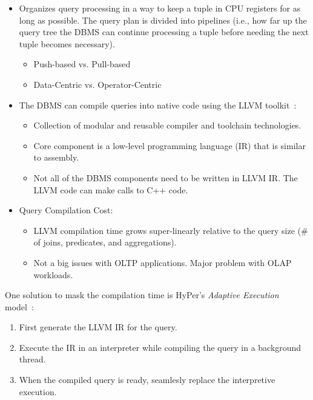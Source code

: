 \documentclass[11pt]{article}
\begin{document}
\begin{itemize}
    \item
    Organizes query processing in a way to keep a tuple in CPU registers for as long as 
    possible. The query plan is divided into pipelines (i.e., how far up the query tree 
    the DBMS can continue processing a tuple before needing the next tuple becomes necessary).
    \begin{itemize}
        \item
        Push-based vs. Pull-based
        
        \item
        Data-Centric vs. Operator-Centric
    \end{itemize}
    
    \item
    The DBMS can compile queries into native code using the LLVM toolkit~\cite{lattner04}:
    \begin{itemize}
        \item
        Collection of modular and reusable compiler and toolchain technologies.
        
        \item
        Core component is a low-level programming language (IR) that is similar to assembly.
        
        \item
        Not all of the DBMS components need to be written in LLVM IR. The LLVM code can 
        make calls to C++ code.
    \end{itemize}
    
    \item Query Compilation Cost:
    \begin{itemize}
        \item
        LLVM compilation time grows super-linearly relative to the query size (\# of joins, 
        predicates, and aggregations).
        
        \item
        Not a big issues with OLTP applications. Major problem with OLAP workloads.
    \end{itemize}
\end{itemize}
        
One solution to mask the compilation time is HyPer's \textit{Adaptive Execution} 
model~\cite{kohn18}:
\begin{enumerate}
    \item
    First generate the LLVM IR for the query.
    
    \item
    Execute the IR in an interpreter while compiling the query in a background thread.
    
    \item
    When the compiled query is ready, seamlesly replace the interpretive execution.
\end{enumerate}
\end{document}
